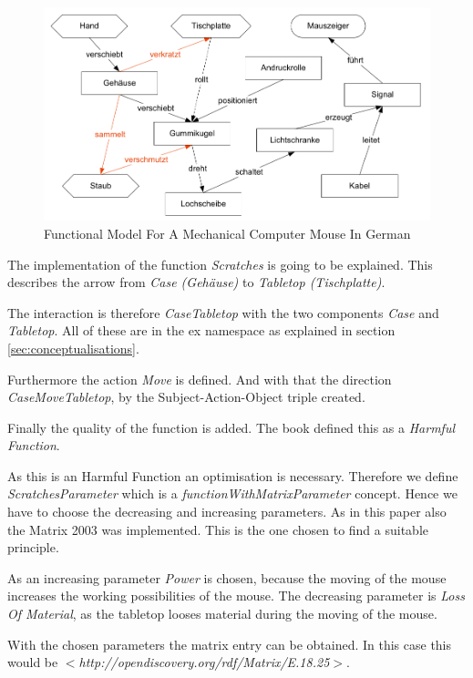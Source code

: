 \documentclass[11pt,a4paper]{article}
\begin{document}
\begin{figure}[ht]
  \centering
  \includegraphics[scale=.6]{mouse.png}
  \caption{Functional Model For A Mechanical Computer Mouse In German}
  \label{fig:functional_model_mechanical_computer_mouse}
\end{figure}

The implementation of the function \textit{Scratches} is going to be
explained.  This describes the arrow from \textit{Case (Gehäuse)} to
\textit{Tabletop (Tischplatte)}.

The interaction is therefore \textit{CaseTabletop} with the two components
\textit{Case} and \textit{Tabletop}.  All of these are in the ex namespace as
explained in section \ref{sec:conceptualisations}.

Furthermore the action \textit{Move} is defined. 
And with that the direction \textit{CaseMoveTabletop}, by the Subject-Action-Object triple created.

Finally the quality of the function is added.  The book defined this as a
\textit{Harmful Function}.

As this is an Harmful Function an optimisation is necessary.  Therefore we
define \textit{ScratchesParameter} which is a
\textit{functionWithMatrixParameter} concept.  Hence we have to choose the
decreasing and increasing parameters.  As in this paper also the Matrix 2003
was implemented.  This is the one chosen to find a suitable principle.

As an increasing parameter \textit{Power} is chosen, because the moving of the
mouse increases the working possibilities of the mouse.  The decreasing
parameter is \textit{Loss Of Material}, as the tabletop looses material during
the moving of the mouse.

With the chosen parameters the matrix entry can be obtained.  In this case
this would be \textit{$<$http://opendiscovery.org/rdf/Matrix/E.18.25$>$}.
\end{document}
